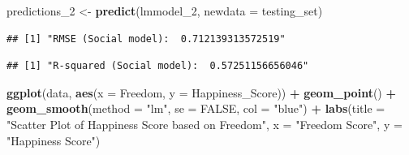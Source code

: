 \documentclass[
  11pt,
]{article}
\newenvironment{Shaded}{\begin{snugshade}}{\end{snugshade}}
\newcommand{\AttributeTok}[1]{\textcolor[rgb]{0.13,0.29,0.53}{#1}}
\newcommand{\ConstantTok}[1]{\textcolor[rgb]{0.56,0.35,0.01}{#1}}
\newcommand{\DecValTok}[1]{\textcolor[rgb]{0.00,0.00,0.81}{#1}}
\newcommand{\FunctionTok}[1]{\textcolor[rgb]{0.13,0.29,0.53}{\textbf{#1}}}
\newcommand{\NormalTok}[1]{#1}
\newcommand{\OtherTok}[1]{\textcolor[rgb]{0.56,0.35,0.01}{#1}}
\newcommand{\SpecialCharTok}[1]{\textcolor[rgb]{0.81,0.36,0.00}{\textbf{#1}}}
\newcommand{\StringTok}[1]{\textcolor[rgb]{0.31,0.60,0.02}{#1}}
\begin{document}
\begin{Shaded}
\begin{Highlighting}[]
\NormalTok{predictions\_2 }\OtherTok{\textless{}{-}} \FunctionTok{predict}\NormalTok{(lmmodel\_2, }\AttributeTok{newdata =}\NormalTok{ testing\_set)}
\end{Highlighting}
\end{Shaded}

\begin{Shaded}
\end{Shaded}

\begin{verbatim}
## [1] "RMSE (Social model):  0.712139313572519"
\end{verbatim}

\begin{Shaded}
\end{Shaded}

\begin{verbatim}
## [1] "R-squared (Social model):  0.57251156656046"
\end{verbatim}

\begin{Shaded}
\begin{Highlighting}[]
\FunctionTok{ggplot}\NormalTok{(data, }\FunctionTok{aes}\NormalTok{(}\AttributeTok{x =}\NormalTok{ Freedom, }\AttributeTok{y =}\NormalTok{ Happiness\_Score)) }\SpecialCharTok{+}
  \FunctionTok{geom\_point}\NormalTok{() }\SpecialCharTok{+}
  \FunctionTok{geom\_smooth}\NormalTok{(}\AttributeTok{method =} \StringTok{"lm"}\NormalTok{, }\AttributeTok{se =} \ConstantTok{FALSE}\NormalTok{, }\AttributeTok{col =} \StringTok{"blue"}\NormalTok{) }\SpecialCharTok{+}
  \FunctionTok{labs}\NormalTok{(}\AttributeTok{title =} \StringTok{"Scatter Plot of Happiness Score based on Freedom"}\NormalTok{, }
       \AttributeTok{x =} \StringTok{"Freedom Score"}\NormalTok{, }
       \AttributeTok{y =} \StringTok{"Happiness Score"}\NormalTok{)}
\end{Highlighting}
\end{Shaded}
\end{document}
